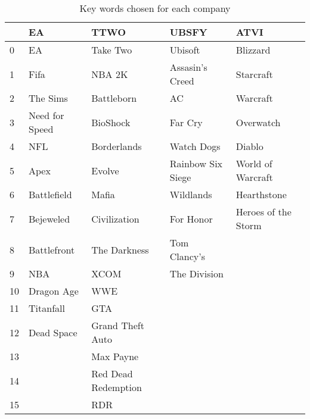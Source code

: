 \documentclass[11pt]{article} %
\begin{document}
\begin{table}[hbt!]
\centering
\caption{Key words chosen for each company}
\begin{tabular}{lllll}
\toprule
{} &              EA &                 TTWO &              UBSFY &                 ATVI \\
\midrule
0  &              EA &             Take Two &            Ubisoft &             Blizzard \\
1  &            Fifa &               NBA 2K &    Assasin's Creed &            Starcraft \\
2  &        The Sims &           Battleborn &                 AC &             Warcraft \\
3  &  Need for Speed &             BioShock &            Far Cry &            Overwatch \\
4  &             NFL &          Borderlands &         Watch Dogs &               Diablo \\
5  &            Apex &               Evolve &  Rainbow Six Siege &    World of Warcraft \\
6  &     Battlefield &                Mafia &          Wildlands &          Hearthstone \\
7  &       Bejeweled &         Civilization &          For Honor &  Heroes of the Storm \\
8  &     Battlefront &         The Darkness &       Tom Clancy's &                  \\
9  &             NBA &                 XCOM &       The Division &                  \\
10 &      Dragon Age &                  WWE &                &                  \\
11 &       Titanfall &                  GTA &                &                  \\
12 &      Dead Space &     Grand Theft Auto &                &                  \\
13 &             &            Max Payne &                &                  \\
14 &             &  Red Dead Redemption &                &                  \\
15 &             &                  RDR &                &                  \\
\bottomrule
\end{tabular}
\end{table}
\end{document}
